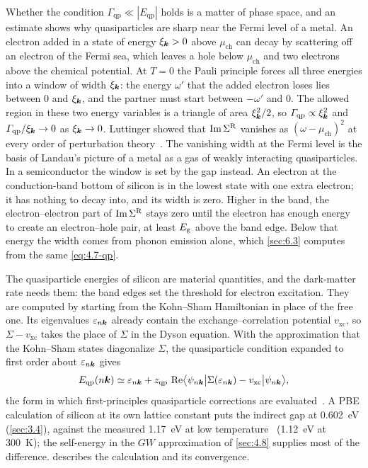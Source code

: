 Whether the condition $\varGamma_{\mathrm{qp}} \ll |E_{\mathrm{qp}}|$ holds is a matter of phase space, and an estimate shows why quasiparticles are sharp near the Fermi level of a metal. An electron added in a state of energy $\xi_{\bm{k}} > 0$ above $\mu_{\mathrm{ch}}$ can decay by scattering off an electron of the Fermi sea, which leaves a hole below $\mu_{\mathrm{ch}}$ and two electrons above the chemical potential. At $T = 0$ the Pauli principle forces all three energies into a window of width $\xi_{\bm{k}}$: the energy $\omega'$ that the added electron loses lies between $0$ and $\xi_{\bm{k}}$, and the partner must start between $-\omega'$ and $0$. The allowed region in these two energy variables is a triangle of area $\xi_{\bm{k}}^2/2$, so $\varGamma_{\mathrm{qp}} \propto \xi_{\bm{k}}^2$ and $\varGamma_{\mathrm{qp}}/\xi_{\bm{k}} \to 0$ as $\xi_{\bm{k}} \to 0$. Luttinger showed that $\operatorname{Im}\Sigma^{\mathrm{R}}$ vanishes as $(\omega - \mu_{\mathrm{ch}})^2$ at every order of perturbation theory~\cite{luttinger1961analytic}. The vanishing width at the Fermi level is the basis of Landau's picture of a metal as a gas of weakly interacting quasiparticles. In a semiconductor the window is set by the gap instead. An electron at the conduction-band bottom of silicon is in the lowest state with one extra electron; it has nothing to decay into, and its width is zero. Higher in the band, the electron--electron part of $\operatorname{Im}\Sigma^{\mathrm{R}}$ stays zero until the electron has enough energy to create an electron--hole pair, at least $E_{\mathrm{g}}$ above the band edge. Below that energy the width comes from phonon emission alone, which \cref{sec:6.3} computes from the same \cref{eq:4.7-qp}.

The quasiparticle energies of silicon are material quantities, and the dark-matter rate needs them: the band edges set the threshold for electron excitation. They are computed by starting from the Kohn--Sham Hamiltonian in place of the free one. Its eigenvalues $\varepsilon_{n\bm{k}}$ already contain the exchange--correlation potential $v_{\mathrm{xc}}$, so $\Sigma - v_{\mathrm{xc}}$ takes the place of $\Sigma$ in the Dyson equation. With the approximation that the Kohn--Sham states diagonalize $\Sigma$, the quasiparticle condition expanded to first order about $\varepsilon_{n\bm{k}}$ gives
\begin{equation}
  E_{\mathrm{qp}}(n\bm{k}) \simeq \varepsilon_{n\bm{k}} + z_{\mathrm{qp}}\,\operatorname{Re}\bigl\langle\psi_{n\bm{k}}\big|\Sigma(\varepsilon_{n\bm{k}}) - v_{\mathrm{xc}}\big|\psi_{n\bm{k}}\bigr\rangle ,
  \label{eq:4.7-G0W0}
\end{equation}
the form in which first-principles quasiparticle corrections are evaluated~\cite{hybertsen1986electron}. A PBE calculation of silicon at its own lattice constant puts the indirect gap at \SI{0.602}{eV} (\cref{sec:3.4}), against the measured \SI{1.17}{eV} at low temperature~\cite[Eq.~(11)]{ramanathan2020ionization} (\SI{1.12}{eV} at \SI{300}{K}); the self-energy in the $GW$ approximation of \cref{sec:4.8} supplies most of the difference.  describes the calculation and its convergence.

